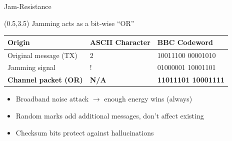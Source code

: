 \documentclass[xcolor=x11names,compress,handout]{beamer}
\begin{document}
\begin{frame}{Jam-Resistance}

	\begin{textblock}{14.5}(0.5,3.5)
		Jamming acts as a bit-wise ``OR''
		\vspace{-12pt}
		 \begin{center}
		 \renewcommand\arraystretch{1.5}
		    \begin{tabular}{ | m{10em} | m{2cm}| m{4.5cm} | } 
		      \hline
		      Origin & ASCII Character & BBC Codeword \\ 
		      \hline\hline
		      Original message (TX) & 2 &  10011100  00001010\\ 
		      \hline
		      Jamming signal        & ! &  01000001  10001101\\ 
		      \hline\hline
		      \textbf{Channel packet (OR)}   &  \textbf{N/A} & \textbf{ 11011101  10001111} \\ 
		      \hline
		   \end{tabular}
		    \end{center}
	\begin{itemize}
		\item Broadband noise attack $\longrightarrow$ enough energy wins (always)
		\item Random marks add additional messages, don't affect existing
		\item Checksum bits protect against hallucinations
	\end{itemize}
	\end{textblock}
\end{frame}

\end{document}
